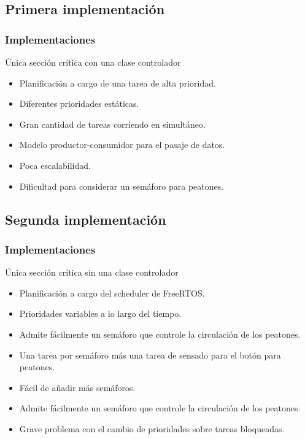 \begin{frame}
\begin{block}{}
\begin{columns}[T]
\begin{column}{.50\textwidth}
	\end{column}
\end{columns}
\end{block}
\end{frame}

\subsection{Primera implementación}

\begin{frame}
\frametitle{Implementaciones}
\begin{block}{Única sección crítica con una clase controlador}
	\begin{itemize}
		\item Planificación a cargo de una tarea de alta prioridad.
		\item Diferentes prioridades estáticas.
		\item Gran cantidad de tareas corriendo en simultáneo.
		\item Modelo productor-consumidor para el pasaje de datos.
		\item Poca escalabilidad.
		\item Dificultad para considerar un semáforo para peatones.
	\end{itemize}
\end{block}
\end{frame}

\subsection{Segunda implementación}
\begin{frame}
\frametitle{Implementaciones}
\begin{block}{Única sección crítica sin una clase controlador}
	\begin{itemize}
		\item Planificación a cargo del scheduler de FreeRTOS.
		\item Prioridades variables a lo largo del tiempo.
		\item Admite fácilmente un semáforo que controle la circulación de los peatones.
		\item Una tarea por semáforo más una tarea de sensado para el botón para peatones.
		\item Fácil de añadir más semáforos.
		\item Admite fácilmente un semáforo que controle la circulación de los peatones.
		\item Grave problema con el cambio de prioridades sobre tareas bloqueadas.
	\end{itemize}
\end{block}
\end{frame}

